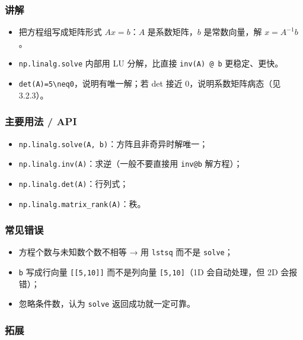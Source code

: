 \subsubsection{讲解}\label{ux8bb2ux89e3-6}

\begin{itemize}
\tightlist
\item
  把方程组写成矩阵形式 \(Ax = b\)：\(A\) 是系数矩阵，\(b\)
  是常数向量，解 \(x = A^{-1}b\)。
\item
  \texttt{np.linalg.solve} 内部用 LU 分解，比直接 \texttt{inv(A)\ @\ b}
  更稳定、更快。
\item
  \texttt{det(A)=5\textbackslash{}neq0}，说明有唯一解；若 det 接近
  0，说明系数矩阵病态（见 3.2.3）。
\end{itemize}

\subsubsection{主要用法 / API}\label{ux4e3bux8981ux7528ux6cd5-api-6}

\begin{itemize}
\tightlist
\item
  \texttt{np.linalg.solve(A,\ b)}：方阵且非奇异时解唯一；
\item
  \texttt{np.linalg.inv(A)}：求逆（一般不要直接用 \texttt{inv@b}
  解方程）；
\item
  \texttt{np.linalg.det(A)}：行列式；
\item
  \texttt{np.linalg.matrix\_rank(A)}：秩。
\end{itemize}

\subsubsection{常见错误}\label{ux5e38ux89c1ux9519ux8bef-6}

\begin{itemize}
\tightlist
\item
  方程个数与未知数个数不相等 → 用 \texttt{lstsq} 而不是 \texttt{solve}；
\item
  \texttt{b} 写成行向量 \texttt{{[}{[}5,10{]}{]}} 而不是列向量
  \texttt{{[}5,10{]}}（1D 会自动处理，但 2D 会报错）；
\item
  忽略条件数，认为 \texttt{solve} 返回成功就一定可靠。
\end{itemize}

\subsubsection{拓展}\label{ux62d3ux5c55-6}


